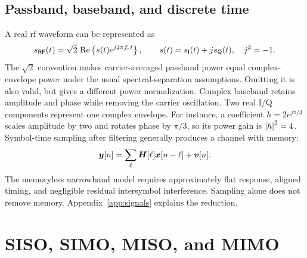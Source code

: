 \subsection{Passband, baseband, and discrete time}
A real \ac{rf} waveform can be represented as
\begin{equation}\label{eq:rf}
s_{\mathsf{RF}}(t)=\sqrt2\,\operatorname{Re}\left\{s(t)e^{j2\pi f_ct}\right\},\qquad
s(t)=s_{\mathsf I}(t)+j s_{\mathsf Q}(t),\quad j^2=-1.
\end{equation}
The $\sqrt2$ convention makes carrier-averaged passband power equal complex-envelope power under the usual spectral-separation assumptions. Omitting it is also valid, but gives a different power normalization. Complex baseband retains amplitude and phase while removing the carrier oscillation. Two real I/Q components represent one complex envelope.
%
For instance, a coefficient $h=2e^{j\pi/3}$ scales amplitude by two and rotates phase by $\pi/3$, so its power gain is $\left|h\right|^2=4$. Symbol-time sampling after filtering generally produces a channel with memory:
\begin{equation}\label{eq:memory}
\bm{y}[n]=\sum_{\ell}\bm{H}[\ell]\bm{x}[n-\ell]+\bm{v}[n].
\end{equation}
The memoryless narrowband model requires approximately flat response, aligned timing, and negligible residual intersymbol interference. Sampling alone does not remove memory. Appendix~\ref{app:signals} explains the reduction.

\section{SISO, SIMO, MISO, and MIMO}
